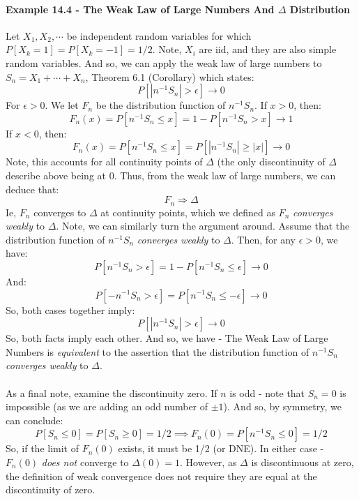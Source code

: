 \documentclass[12pt,a4paper]{article}
\newcommand{\1}[1]{\mathbbm{1}\left\{ #1 \right\}}
\begin{document}
\paragraph{Example 14.4 - The Weak Law of Large Numbers And $\Delta$ Distribution} Let $X_1, X_2, \cdots$ be independent random variables for which $P[X_k = 1] = P[X_k = -1] = 1/2$. Note, $X_i$ are iid, and they are also simple random variables. And so, we can apply the weak law of large numbers to $S_n = X_1 + \cdots + X_n$, Theorem 6.1 (Corollary) which states:
$$
	P\left[|n^{-1}S_n| > \epsilon\right] \to 0
$$
For $\epsilon > 0$. We let $F_n$ be the distribution function of $n^{-1}S_n$. If $x > 0$, then:
$$
	F_n(x) = P\left[n^{-1}S_n \leq x\right] = 1 - P\left[n^{-1}S_n > x\right] \to 1
$$
If $x < 0$, then:
$$
	F_n(x) = P\left[n^{-1}S_n \leq x\right] = P\left[|n^{-1}S_n| \geq |x|\right] \to 0
$$
Note, this accounts for all continuity points of $\Delta$ (the only discontinuity of $\Delta$ describe above being at $0$. Thus, from the weak law of large numbers, we can deduce that:
$$
	F_n \Rightarrow \Delta
$$
Ie, $F_n$ converges to $\Delta$ at continuity points, which we defined as $F_n$ \textit{converges weakly} to $\Delta$. Note, we can similarly turn the argument around. Assume that the distribution function of $n^{-1}S_n$ \textit{converges weakly} to $\Delta$. Then, for any $\epsilon > 0$, we have:
$$
	P\left[n^{-1}S_n > \epsilon\right] = 1 - P\left[n^{-1}S_n \leq \epsilon\right] \to 0
$$
And:
$$
	P\left[-n^{-1}S_n > \epsilon\right] = P\left[n^{-1}S_n \leq -\epsilon\right] \to 0
$$
So, both cases together imply:
$$
	P\left[|n^{-1}S_n| > \epsilon\right] \to 0
$$
So, both facts imply each other. And so, we have - The Weak Law of Large Numbers is \textit{equivalent} to the assertion that the distribution function of $n^{-1}S_n$ \textit{converges weakly} to $\Delta$.
\\\\
As a final note, examine the discontinuity zero. If $n$ is odd - note that $S_n = 0$ is impossible (as we are adding an odd number of $\pm 1$). And so, by symmetry, we can conclude:
$$
	P[S_n \leq 0] = P[S_n \geq 0] = 1/2 \implies
	F_n(0) = P[n^{-1}S_n \leq 0] = 1/2
$$
So, if the limit of $F_n(0)$ exists, it must be 1/2 (or DNE). In either case - $F_n(0)$ \textit{does not} converge to $\Delta(0) = 1$. However, as $\Delta$ is discontinuous at zero, the definition of weak convergence does not require they are equal at the discontinuity of zero.
\end{document}

